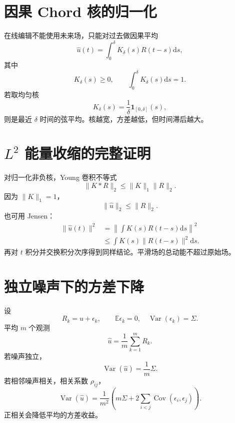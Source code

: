 \documentclass[UTF8,12pt,a4paper,fontset=none]{ctexart}
\numberwithin{equation}{section}
\newcommand{\E}{\mathbb{E}}
\newcommand{\dd}{\mathrm{d}}
\begin{document}
\section{因果 Chord 核的归一化}
在线编辑不能使用未来场，只能对过去做因果平均
\begin{equation}
 \widehat u(t)=\int_0^\delta K_\delta(s)R(t-s)\dd s,
\end{equation}
其中
\begin{equation}
 K_\delta(s)\ge0,
 \qquad \int_0^\delta K_\delta(s)\dd s=1.
\end{equation}
若取均匀核
\begin{equation}
 K_\delta(s)=\frac1\delta\mathbf 1_{[0,\delta]}(s),
\end{equation}
则是最近 $\delta$ 时间的弦平均。核越宽，方差越低，但时间滞后越大。

\section{$L^2$ 能量收缩的完整证明}
对归一化非负核，Young 卷积不等式
\begin{equation}
 \|K*R\|_2\le\|K\|_1\|R\|_2.
\end{equation}
因为 $\|K\|_1=1$，
\begin{equation}
 \boxed{\|\widehat u\|_2\le\|R\|_2.}
\end{equation}
也可用 Jensen：
\begin{align}
 \|\widehat u(t)\|^2
 &=\left\|\int K(s)R(t-s)\dd s\right\|^2\\
 &\le\int K(s)\|R(t-s)\|^2\dd s.
\end{align}
再对 $t$ 积分并交换积分次序得到同样结论。平滑场的总动能不超过原始场。

\section{独立噪声下的方差下降}
设
\begin{equation}
 R_k=u+\epsilon_k,
 \qquad \E\epsilon_k=0,
 \quad \operatorname{Var}(\epsilon_k)=\Sigma.
\end{equation}
平均 $m$ 个观测
\begin{equation}
 \widehat u=\frac1m\sum_{k=1}^{m}R_k.
\end{equation}
若噪声独立，
\begin{equation}
 \operatorname{Var}(\widehat u)=\frac1m\Sigma.
\end{equation}
若相邻噪声相关，相关系数 $\rho_{ij}$，
\begin{equation}
 \operatorname{Var}(\widehat u)
 =\frac1{m^2}
 \left(m\Sigma+
 2\sum_{i<j}\operatorname{Cov}(\epsilon_i,\epsilon_j)\right).
\end{equation}
正相关会降低平均的方差收益。
\end{document}
